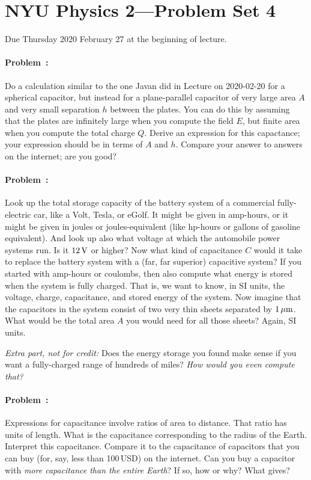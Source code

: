 \documentclass[12pt]{article}
\begin{document}
\section*{NYU Physics 2---Problem Set 4}

Due Thursday 2020 February 27 at the beginning of lecture.

\paragraph{Problem~\theproblem:}%
Do a calculation similar to the one Javan did in Lecture on 2020-02-20
for a spherical capacitor, but instead for a plane-parallel capacitor
of very large area $A$ and very small separation $h$ between the
plates. You can do this by assuming that the plates are infinitely
large when you compute the field $E$, but finite area when you compute the
total charge $Q$. Derive an expression for this capactance; your
expression should be in terms of $A$ and $h$. Compare your answer to
answers on the internet; are you good?

\paragraph{Problem~\theproblem:}%
Look up the total storage capacity of the battery system of a
commercial fully-electric car, like a Volt, Tesla, or eGolf. It might
be given in amp-hours, or it might be given in joules or
joules-equivalent (like hp-hours or gallons of gasoline
equivalent). And look up also what voltage at which the automobile
power systems run. Is it $12\,\mathrm{V}$ or higher? Now what kind of
capacitance $C$ would it take to replace the battery system with a
(far, far superior) capacitive system? If you started with amp-hours
or coulombs, then also compute what energy is stored when the system
is fully charged. That is, we want to know, in SI units, the voltage,
charge, capacitance, and stored energy of the system. Now imagine that
the capacitors in the system consist of two very thin sheets separated
by $1\,\mathrm{\mu m}$.  What would be the total area $A$ you would need for all
those sheets? Again, SI units.

\emph{Extra part, not for credit:} Does the energy storage you found
make sense if you want a fully-charged range of hundreds of miles? \emph{How
would you even compute that?}

\paragraph{Problem~\theproblem:}%
Expressions for capacitance involve ratios of area to distance.  That
ratio has units of length. What is the capacitance corresponding to
the radius of the Earth. Interpret this capacitance. Compare it to the
capacitance of capacitors that you can buy (for, say, less than
100\,USD) on the internet. Can you buy a capacitor with \emph{more
  capacitance than the entire Earth}? If so, how or why? What gives?
\end{document}
